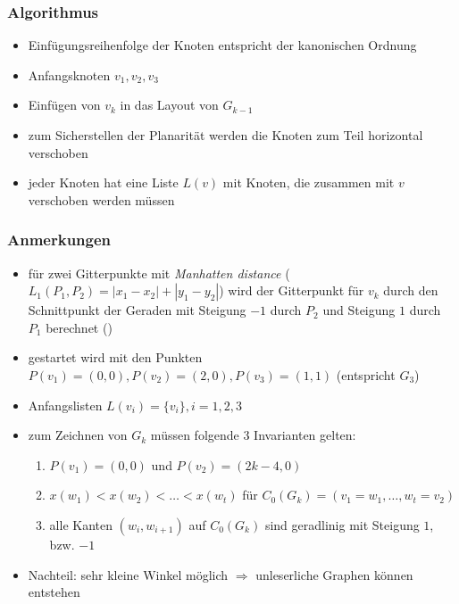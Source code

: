 \subsubsection{Algorithmus}
\begin{itemize}[itemsep=-1pt]
	\item Einfügungsreihenfolge der Knoten entspricht der kanonischen Ordnung
	\item Anfangsknoten $v_1,v_2,v_3$
	\item Einfügen von $v_k$ in das Layout von $G_{k-1}$
	\item zum Sicherstellen der Planarität werden die Knoten zum Teil horizontal verschoben
	\item jeder Knoten hat eine Liste $L(v)$ mit Knoten, die zusammen mit $v$ verschoben werden müssen
\end{itemize}
\vspace*{-\baselineskip}

\topbreak
\vspace*{-2\baselineskip}
\subsubsection{Anmerkungen}
\begin{itemize}[itemsep=-1pt]
	\item für zwei Gitterpunkte mit \textit{Manhatten distance} ($L_1(P_1,P_2)=|x_1-x_2|+|y_1-y_2|$) wird der Gitterpunkt für $v_k$ durch den Schnittpunkt der Geraden mit Steigung $-1$ durch $P_2$ und Steigung $1$ durch $P_1$ berechnet ()
	\item gestartet wird mit den Punkten $P(v_1)=(0,0),P(v_2)=(2,0),P(v_3)=(1,1)$ (entspricht $G_3$)
	\item Anfangslisten $L(v_i)=\{v_i\},i=1,2,3$
	\item zum Zeichnen von $G_k$ müssen folgende $3$ Invarianten gelten:
		\begin{enumerate}[itemsep=-1pt]
			\item $P(v_1)=(0,0)$ und $P(v_2)=(2k-4,0)$
			\item $x(w_1)<x(w_2)<\dots<x(w_t)$ für $C_0(G_k)=(v_1=w_1,\dots,w_t=v_2)$
			\item alle Kanten $(w_i,w_{i+1})$ auf $C_0(G_k)$ sind geradlinig mit Steigung $1$, bzw. $-1$
		\end{enumerate}
	\item Nachteil: sehr kleine Winkel möglich $\Rightarrow$ unleserliche Graphen können entstehen
\end{itemize}